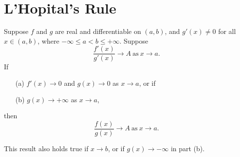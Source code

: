 \documentclass[11pt,a4paper]{book}
\begin{document}
\section{L'Hopital's Rule}

\begin{theorem}[5.13]
    Suppose \( f  \) and \( g  \) are real and differentiable on \( (a,b) \), and \( g'(x) \neq 0  \) for all \( x \in (a,b) \), where \( - \infty  \leq a < b \leq + \infty  \). Suppose
    \[ \frac{ f'(x) }{ g'(x) }  \to A \ \text{as} \ x \to a. \]
    If
    \begin{enumerate}
        \item[(a)] \( f'(x) \to 0  \) and \( g(x) \to 0  \) as \( x \to a  \), or if
        \item[(b)] \( g(x) \to + \infty  \) as \( x \to a  \),
    \end{enumerate}
    then 
    \[  \frac{ f(x) }{ g(x) }  \to A \ \text{as} \ x \to a. \]
\end{theorem}

This result also holds true if \( x \to b  \), or if \( g(x) \to - \infty  \) in part (b).
\end{document}
